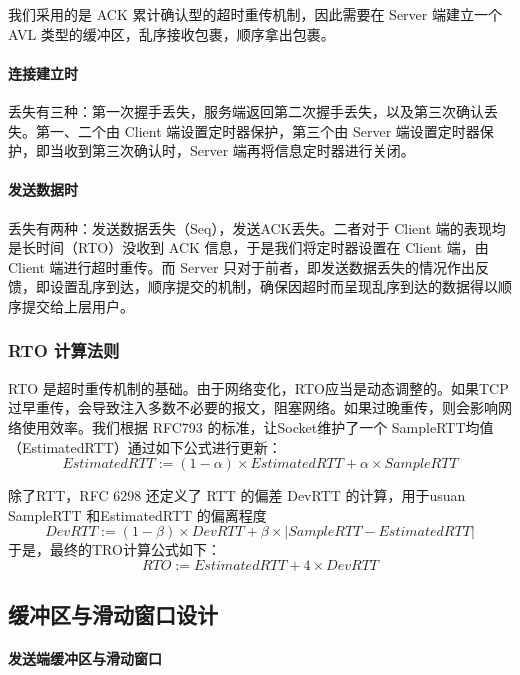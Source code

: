 我们采用的是 ACK 累计确认型的超时重传机制，因此需要在 Server 端建立一个 AVL 类型的缓冲区，乱序接收包裹，顺序拿出包裹。

\paragraph*{连接建立时} 丢失有三种：第一次握手丢失，服务端返回第二次握手丢失，以及第三次确认丢失。第一、二个由 Client 端设置定时器保护，第三个由 Server 端设置定时器保护，即当收到第三次确认时，Server 端再将信息定时器进行关闭。

\paragraph*{发送数据时} 丢失有两种：发送数据丢失（Seq），发送ACK丢失。二者对于 Client 端的表现均是长时间（RTO）没收到 ACK 信息，于是我们将定时器设置在 Client 端，由 Client 端进行超时重传。而 Server 只对于前者，即发送数据丢失的情况作出反馈，即设置乱序到达，顺序提交的机制，确保因超时而呈现乱序到达的数据得以顺序提交给上层用户。

\subsubsection*{RTO 计算法则}

RTO 是超时重传机制的基础。由于网络变化，RTO应当是动态调整的。如果TCP 过早重传，会导致注入多数不必要的报文，阻塞网络。如果过晚重传，则会影响网络使用效率。我们根据 RFC793 的标准，让Socket维护了一个 SampleRTT均值（EstimatedRTT）通过如下公式进行更新：
\begin{equation}
    EstimatedRTT := (1-\alpha)\times EstimatedRTT + \alpha\times SampleRTT
\end{equation}\label{eq:est}

除了RTT，RFC 6298 还定义了 RTT 的偏差 DevRTT 的计算，用于usuan SampleRTT 和EstimatedRTT 的偏离程度
\begin{equation}
    DevRTT := (1-\beta)\times DevRTT + \beta\times|SampleRTT - EstimatedRTT|
\end{equation}
于是，最终的TRO计算公式如下：
\begin{equation}
    RTO := EstimatedRTT + 4\times DevRTT
\end{equation}\label{eq:rto}

\subsection{缓冲区与滑动窗口设计}

\paragraph*{发送端缓冲区与滑动窗口}

